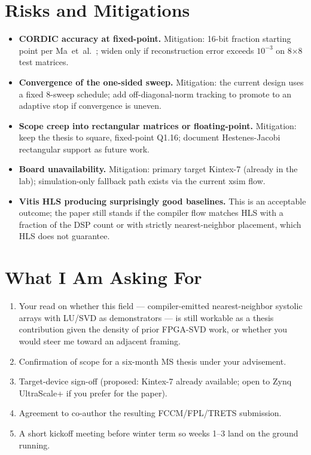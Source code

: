\documentclass[11pt,letterpaper]{article}
\begin{document}
\section{Risks and Mitigations}

\begin{itemize}
  \item \textbf{CORDIC accuracy at fixed-point.} Mitigation: 16-bit fraction starting point per Ma~et~al.~\cite{ma2006}; widen only if reconstruction error exceeds $10^{-3}$ on 8$\times$8 test matrices.
  \item \textbf{Convergence of the one-sided sweep.} Mitigation: the current design uses a fixed 8-sweep schedule; add off-diagonal-norm tracking to promote to an adaptive stop if convergence is uneven.
  \item \textbf{Scope creep into rectangular matrices or floating-point.} Mitigation: keep the thesis to square, fixed-point Q1.16; document Hestenes-Jacobi rectangular support as future work.
  \item \textbf{Board unavailability.} Mitigation: primary target Kintex-7 (already in the lab); simulation-only fallback path exists via the current xsim flow.
  \item \textbf{Vitis HLS producing surprisingly good baselines.} This is an acceptable outcome; the paper still stands if the compiler flow matches HLS with a fraction of the DSP count or with strictly nearest-neighbor placement, which HLS does not guarantee.
\end{itemize}

\section{What I Am Asking For}

\begin{enumerate}
  \item Your read on whether this field --- compiler-emitted nearest-neighbor systolic arrays with LU/SVD as demonstrators --- is still workable as a thesis contribution given the density of prior FPGA-SVD work, or whether you would steer me toward an adjacent framing.
  \item Confirmation of scope for a six-month MS thesis under your advisement.
  \item Target-device sign-off (proposed: Kintex-7 already available; open to Zynq UltraScale+ if you prefer for the paper).
  \item Agreement to co-author the resulting FCCM/FPL/TRETS submission.
  \item A short kickoff meeting before winter term so weeks 1--3 land on the ground running.
\end{enumerate}
\end{document}
